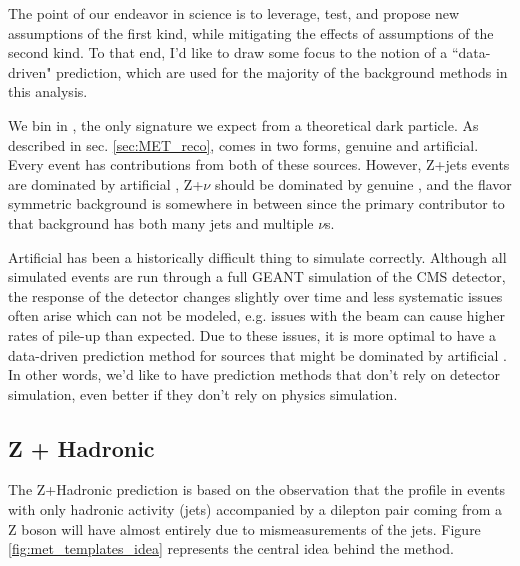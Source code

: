     The point of our endeavor in science is to leverage, test, and propose new assumptions of the first kind, while mitigating the effects of assumptions of the second kind. To that end, I'd like to draw some focus to the notion of a ``data-driven" prediction, which are used for the majority of the background methods in this analysis.

    We bin in \MET, the only signature we expect from a theoretical dark particle. As described in sec. \ref{sec:MET_reco}, \MET comes in two forms, genuine and artificial. Every event has contributions from both of these sources. However, Z+jets events are dominated by artificial \MET, Z+$\nu$ should be dominated by genuine \MET, and the flavor symmetric background is somewhere in between since the primary contributor to that background has both many jets and multiple $\nu$s.

    Artificial \MET has been a historically difficult thing to simulate correctly. Although all simulated events are run through a full GEANT simulation of the CMS detector, the response of the detector changes slightly over time and less systematic issues often arise which can not be modeled, e.g. issues with the beam can cause higher rates of pile-up than expected. Due to these issues, it is more optimal to have a data-driven prediction method for sources that might be dominated by artificial \MET. In other words, we'd like to have prediction methods that don't rely on detector simulation, even better if they don't rely on physics simulation. 

  \subsection{Z + Hadronic} \label{sec:z_+_hadronic}
    The Z+Hadronic prediction is based on the observation that the \MET profile in events with only hadronic activity (jets) accompanied by a dilepton pair coming from a Z boson will have \MET almost entirely due to mismeasurements of the jets. Figure \ref{fig:met_templates_idea} represents the central idea behind the method. 

